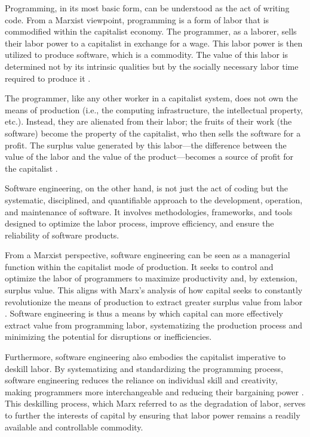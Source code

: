 \begin{refsection}
\begin{multicols}{2}
{Programming, in its most basic form, can be understood as the act of writing code. From a Marxist viewpoint, programming is a form of labor that is commodified within the capitalist economy. The programmer, as a laborer, sells their labor power to a capitalist in exchange for a wage. This labor power is then utilized to produce software, which is a commodity. The value of this labor is determined not by its intrinsic qualities but by the socially necessary labor time required to produce it \cite{marx1867capital}.

The programmer, like any other worker in a capitalist system, does not own the means of production (i.e., the computing infrastructure, the intellectual property, etc.). Instead, they are alienated from their labor; the fruits of their work (the software) become the property of the capitalist, who then sells the software for a profit. The surplus value generated by this labor—the difference between the value of the labor and the value of the product—becomes a source of profit for the capitalist \cite{fuchs2015digital}.

Software engineering, on the other hand, is not just the act of coding but the systematic, disciplined, and quantifiable approach to the development, operation, and maintenance of software. It involves methodologies, frameworks, and tools designed to optimize the labor process, improve efficiency, and ensure the reliability of software products.

From a Marxist perspective, software engineering can be seen as a managerial function within the capitalist mode of production. It seeks to control and optimize the labor of programmers to maximize productivity and, by extension, surplus value. This aligns with Marx's analysis of how capital seeks to constantly revolutionize the means of production to extract greater surplus value from labor \cite{marx1857grundrisse}. Software engineering is thus a means by which capital can more effectively extract value from programming labor, systematizing the production process and minimizing the potential for disruptions or inefficiencies.

Furthermore, software engineering also embodies the capitalist imperative to deskill labor. By systematizing and standardizing the programming process, software engineering reduces the reliance on individual skill and creativity, making programmers more interchangeable and reducing their bargaining power \cite{braverman1974labor}. This deskilling process, which Marx referred to as the degradation of labor, serves to further the interests of capital by ensuring that labor power remains a readily available and controllable commodity.

}
\end{multicols}
\end{refsection}
